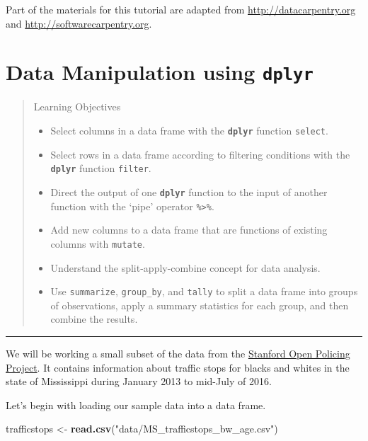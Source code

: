 \documentclass[]{book}
\newenvironment{Shaded}{\begin{snugshade}}{\end{snugshade}}
\newcommand{\KeywordTok}[1]{\textcolor[rgb]{0.13,0.29,0.53}{\textbf{#1}}}
\newcommand{\StringTok}[1]{\textcolor[rgb]{0.31,0.60,0.02}{#1}}
\newcommand{\NormalTok}[1]{#1}
\providecommand{\tightlist}{%
  \setlength{\itemsep}{0pt}\setlength{\parskip}{0pt}}
\theoremstyle{definition}
\theoremstyle{definition}
\theoremstyle{definition}
\theoremstyle{remark}
\begin{document}
Part of the materials for this tutorial are adapted from
\url{http://datacarpentry.org} and \url{http://softwarecarpentry.org}.

\chapter{\texorpdfstring{Data Manipulation using
\textbf{\texttt{dplyr}}}{Data Manipulation using dplyr}}\label{dplyr}

\begin{quote}
Learning Objectives

\begin{itemize}
\tightlist
\item
  Select columns in a data frame with the \textbf{\texttt{dplyr}}
  function \texttt{select}.
\item
  Select rows in a data frame according to filtering conditions with the
  \textbf{\texttt{dplyr}} function \texttt{filter}.
\item
  Direct the output of one \textbf{\texttt{dplyr}} function to the input
  of another function with the `pipe' operator
  \texttt{\%\textgreater{}\%}.
\item
  Add new columns to a data frame that are functions of existing columns
  with \texttt{mutate}.
\item
  Understand the split-apply-combine concept for data analysis.
\item
  Use \texttt{summarize}, \texttt{group\_by}, and \texttt{tally} to
  split a data frame into groups of observations, apply a summary
  statistics for each group, and then combine the results.
\end{itemize}
\end{quote}

\begin{center}\rule{0.5\linewidth}{\linethickness}\end{center}

We will be working a small subset of the data from the
\href{https://openpolicing.stanford.edu}{Stanford Open Policing
Project}. It contains information about traffic stops for blacks and
whites in the state of Mississippi during January 2013 to mid-July of
2016.

Let's begin with loading our sample data into a data frame.

\begin{Shaded}
\begin{Highlighting}[]
\NormalTok{trafficstops <-}\StringTok{ }\KeywordTok{read.csv}\NormalTok{(}\StringTok{"data/MS_trafficstops_bw_age.csv"}\NormalTok{)}
\end{Highlighting}
\end{Shaded}
\end{document}
